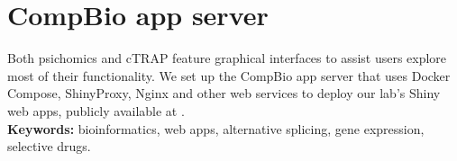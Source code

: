 \section*{CompBio app server}

Both psichomics and cTRAP feature graphical interfaces to assist users explore most of their functionality. We set up the CompBio app server that uses Docker Compose, ShinyProxy, Nginx and other web services to deploy our lab's Shiny web apps, publicly available at .\\

\textbf{Keywords:} bioinformatics, web apps, alternative splicing, gene expression, selective drugs.

